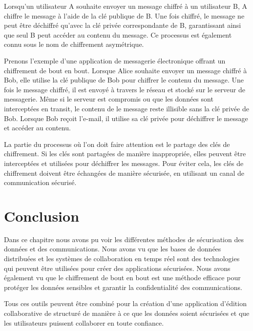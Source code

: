 Lorsqu'un utilisateur A souhaite envoyer un message chiffré à un utilisateur B, A chiffre le message à l'aide de la clé publique de B. Une fois chiffré, le message ne peut être déchiffré qu'avec la clé privée correspondante de B, garantissant ainsi que seul B peut accéder au contenu du message. Ce processus est également connu sous le nom de chiffrement asymétrique.

Prenons l'exemple d'une application de messagerie électronique offrant un chiffrement de bout en bout. Lorsque Alice souhaite envoyer un message chiffré à Bob, elle utilise la clé publique de Bob pour chiffrer le contenu du message. Une fois le message chiffré, il est envoyé à travers le réseau et stocké sur le serveur de messagerie. Même si le serveur est compromis ou que les données sont interceptées en transit, le contenu de le message reste illisible sans la clé privée de Bob. Lorsque Bob reçoit l'e-mail, il utilise sa clé privée pour déchiffrer le message et accéder au contenu.

La partie du processus où l'on doit faire attention est le partage des clés de chiffrement. Si les clés sont partagées de manière inappropriée, elles peuvent être interceptées et utilisées pour déchiffrer les messages. Pour éviter cela, les clés de chiffrement doivent être échangées de manière sécurisée, en utilisant un canal de communication sécurisé.

\section{Conclusion}

Dans ce chapitre nous avons pu voir les différentes méthodes de sécurisation des données et des communications. Nous avons vu que les bases de données distribuées et les systèmes de collaboration en temps réel sont des technologies qui peuvent être utilisées pour créer des applications sécurisées. Nous avons également vu que le chiffrement de bout en bout est une méthode efficace pour protéger les données sensibles et garantir la confidentialité des communications.

Tous ces outils peuvent être combiné pour la création d'une application d'édition collaborative de structuré de manière à ce que les données soient sécurisées et que les utilisateurs puissent collaborer en toute confiance.
